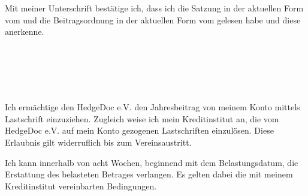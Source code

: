 \documentclass[paper=a4,twoside=false,DIV=15,fontsize=11pt,parskip=half]{scrartcl}
\begin{document}
\begin{Form}
Mit meiner Unterschrift bestätige ich, dass ich die Satzung in der aktuellen Form vom \datumsatzung und die Beitragsordnung in der aktuellen Form vom \datumbeitrago gelesen habe und diese anerkenne.

\vspace{0.85cm}

 \hfill {}\\[0.5mm]

\clearpage

\\[2mm]
\\[2mm]
\hfill {}\\[2mm]

Ich ermächtige den HedgeDoc e.V. den Jahresbeitrag von meinem Konto mittels Lastschrift einzuziehen. 
Zugleich weise ich mein Kreditinstitut an, die vom HedgeDoc e.V. auf mein Konto gezogenen Lastschriften einzulösen. 
Diese Erlaubnis gilt widerruflich bis zum Vereinsaustritt.

Ich kann innerhalb von acht Wochen, beginnend mit dem Belastungsdatum, die Erstattung des belasteten Betrages verlangen.
Es gelten dabei die mit meinem Kreditinstitut vereinbarten Bedingungen.

\vspace{1cm}

 \hfill {}\\[0.5mm]
\end{Form}
\end{document}
